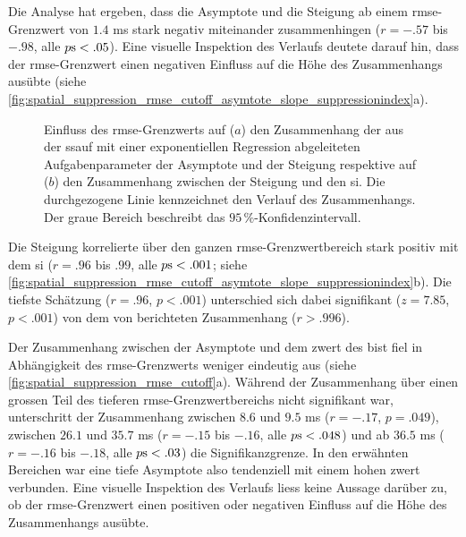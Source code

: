 \documentclass[11pt, twoside, a4paper]{book}		%
\begin{document}
Die Analyse hat ergeben, dass die Asymptote und die Steigung ab einem \gls{rmse}-Grenzwert von $1.4$ ms stark negativ miteinander zusammenhingen ($r=-.57$ bis $-.98$, alle $p\textnormal{s}<.05$). Eine visuelle Inspektion des Verlaufs deutete darauf hin, dass der \gls{rmse}-Grenzwert einen negativen Einfluss auf die Höhe des Zusammenhangs ausübte (siehe \autoref{fig:spatial_suppression_rmse_cutoff_asymtote_slope_suppressionindex}a).

\begin{figure}[htbp]
	\centering
	\begin{adjustbox}{width=1\textwidth}
	\end{adjustbox}
	\newline
	\begin{adjustbox}{width=1\textwidth}
	\end{adjustbox}
	\caption[RMSE einfluss]{Einfluss des \gls{rmse}-Grenzwerts auf ($a$) den Zusammenhang der aus der \gls{ssauf} mit einer exponentiellen Regression abgeleiteten Aufgabenparameter der Asymptote und der Steigung  respektive auf ($b$) den Zusammenhang zwischen der Steigung und den \gls{si}. Die durchgezogene Linie kennzeichnet den Verlauf des Zusammenhangs. Der graue Bereich beschreibt das $95\,\%$-Konfidenzintervall.}
	\label{fig:spatial_suppression_rmse_cutoff_asymtote_slope_suppressionindex}
\end{figure}

Die Steigung korrelierte über den ganzen \gls{rmse}-Grenzwertbereich stark positiv mit dem \gls{si} ($r=.96$ bis $.99$, alle $p\textnormal{s}<.001$; siehe \autoref{fig:spatial_suppression_rmse_cutoff_asymtote_slope_suppressionindex}b). Die tiefste Schätzung ($r=.96$, $p<.001$) unterschied sich dabei signifikant ($z=7.85$, $p<.001$) von dem von \citet{Melnick2013} berichteten Zusammenhang ($r>.996$).

Der Zusammenhang zwischen der Asymptote und dem \gls{zwert} des \gls{bist} fiel in Abhängigkeit des \gls{rmse}-Grenzwerts weniger eindeutig aus (siehe \autoref{fig:spatial_suppression_rmse_cutoff}a).
Während der Zusammenhang über einen grossen Teil des tieferen \gls{rmse}-Grenzwertbereichs nicht signifikant war, unterschritt der Zusammenhang zwischen $8.6$ und $9.5$ ms ($r = -.17$, $p = .049$), zwischen $26.1$ und $35.7$ ms ($r = -.15$ bis $ -.16$, alle $p\textnormal{s} < .048$) und ab $36.5$ ms ($r = -.16$ bis $-.18$, alle $p\textnormal{s} < .03$) die Signifikanzgrenze. In den erwähnten Bereichen war eine tiefe Asymptote also tendenziell mit einem hohen \gls{zwert} verbunden. Eine visuelle Inspektion des Verlaufs liess keine Aussage darüber zu, ob der  \gls{rmse}-Grenzwert einen positiven oder negativen Einfluss auf die Höhe des Zusammenhangs ausübte.
\end{document}
